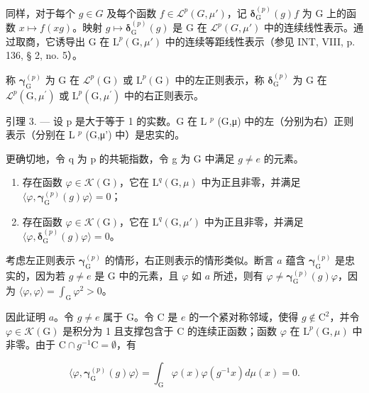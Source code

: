 同样，对于每个 \(g \in G\) 及每个函数 \(f \in \mathcal{L}^{p}(G, \mu')\)，记 \(\boldsymbol{\delta}_{\mathrm{G}}^{(p)}(g)f\) 为 G 上的函数 \(x \mapsto f(xg)\)。映射 \(g \mapsto \boldsymbol{\delta}_{\mathrm{G}}^{(p)}(g)\) 是 G 在 \(\mathcal{L}^{p}(G, \mu')\) 中的连续线性表示。通过取商，它诱导出 G 在 \(\mathrm{L}^{p}(\mathrm{G}, \mu')\) 中的连续等距线性表示（参见 INT, VIII, p. 136, § 2, no. 5）。

称 \(\boldsymbol{\gamma}_{\mathrm{G}}^{(p)}\) 为 G 在 \(\mathcal{L}^{p}(\mathrm{G})\) 或 \(\mathrm{L}^{p}(\mathrm{G})\) 中的左正则表示，称 \(\boldsymbol{\delta}_{\mathrm{G}}^{(p)}\) 为 G 在 \(\mathcal{L}^{p}(\mathrm{G},\mu^{\prime})\) 或 \(\mathrm{L}^{p}(\mathrm{G},\mu^{\prime})\) 中的右正则表示。

引理 3. — 设 p 是大于等于 1 的实数。G 在 L \(^{p}\) (G,μ) 中的左（分别为右）正则表示（分别在 L \(^{p}\) (G,μ') 中）是忠实的。

更确切地，令 q 为 p 的共轭指数，令 g 为 G 中满足 \(g \neq e\) 的元素。

\begin{enumerate}
\def\labelenumi{\alph{enumi})}
\item
  存在函数 \(\varphi\in\mathcal{K}(\mathrm{G})\)，它在 \(\mathrm{L}^{q}(\mathrm{G},\mu)\) 中为正且非零，并满足 \(\langle\varphi,\boldsymbol{\gamma}_{\mathrm{G}}^{(p)}(g)\varphi\rangle=0\)；
\item
  存在函数 \(\varphi\in\mathcal{K}(\mathrm{G})\)，它在 \(\mathrm{L}^{q}(\mathrm{G},\mu')\) 中为正且非零，并满足 \(\langle\varphi,\boldsymbol{\delta}_{\mathrm{G}}^{(p)}(g)\varphi\rangle=0\)。
\end{enumerate}

考虑左正则表示 \(\boldsymbol{\gamma}_{\mathrm{G}}^{(p)}\) 的情形，右正则表示的情形类似。断言 \(a\) 蕴含 \(\boldsymbol{\gamma}_{\mathrm{G}}^{(p)}\) 是忠实的，因为若 \(g \neq e\) 是 G 中的元素，且 \(\varphi\) 如 \(a\) 所述，则有 \(\varphi \neq \boldsymbol{\gamma}_{\mathrm{G}}^{(p)}(g)\varphi\)，因为 \(\langle \varphi, \varphi \rangle = \int_{\mathrm{G}} \varphi^2 > 0\)。

因此证明 \(a\)。令 \(g \neq e\) 属于 G。令 C 是 \(e\) 的一个紧对称邻域，使得 \(g \notin \mathrm{C}^2\)，并令 \(\varphi \in \mathcal{K}(\mathrm{G})\) 是积分为 1 且支撑包含于 C 的连续正函数；函数 \(\varphi\) 在 \(\mathrm{L}^p(\mathrm{G}, \mu)\) 中非零。由于 \(\mathrm{C} \cap g^{-1}\mathrm{C} = \emptyset\)，有

\[
\langle \varphi , \boldsymbol {\gamma} _ {\mathrm{G}} ^ {(p)} (g) \varphi \rangle = \int_ {\mathrm{G}} \varphi (x) \varphi (g ^ {- 1} x) d \mu (x) = 0.
\]

